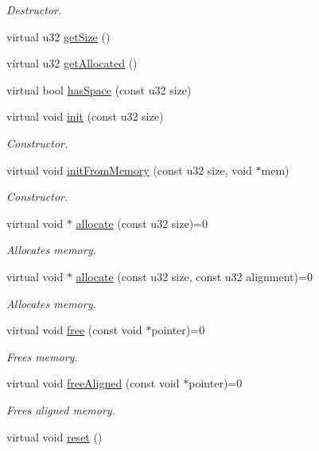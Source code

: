 \begin{DoxyCompactItemize}
\begin{DoxyCompactList}\small\item\em Destructor. \end{DoxyCompactList}\item 
virtual u32 \hyperlink{classDE_1_1Allocator_af8e9d8df95e03bd2a5d2242d67c37ff2}{get\+Size} ()
\item 
virtual u32 \hyperlink{classDE_1_1Allocator_ab1cd017ccd297924b3afec3588f42848}{get\+Allocated} ()
\item 
virtual bool \hyperlink{classDE_1_1Allocator_a021200fc6a7c6fae64e7e98907d334b2}{has\+Space} (const u32 size)
\item 
virtual void \hyperlink{classDE_1_1Allocator_a891c3a1ec3d3713cc742412ac184a6e5}{init} (const u32 size)
\begin{DoxyCompactList}\small\item\em Constructor. \end{DoxyCompactList}\item 
virtual void \hyperlink{classDE_1_1Allocator_acb18b8358ee9565b3ad0c6f1bff1e65e}{init\+From\+Memory} (const u32 size, void $\ast$mem)
\begin{DoxyCompactList}\small\item\em Constructor. \end{DoxyCompactList}\item 
virtual void $\ast$ \hyperlink{classDE_1_1Allocator_a5dfb8172ab7053e4e6e9f21e02bc26f5}{allocate} (const u32 size)=0
\begin{DoxyCompactList}\small\item\em Allocates memory. \end{DoxyCompactList}\item 
virtual void $\ast$ \hyperlink{classDE_1_1Allocator_a87ab42c72ead365ef0f04b9d8ba31b24}{allocate} (const u32 size, const u32 alignment)=0
\begin{DoxyCompactList}\small\item\em Allocates memory. \end{DoxyCompactList}\item 
virtual void \hyperlink{classDE_1_1Allocator_a9a01f5da5adafc6d5cee9b3e3e9859c4}{free} (const void $\ast$pointer)=0
\begin{DoxyCompactList}\small\item\em Frees memory. \end{DoxyCompactList}\item 
virtual void \hyperlink{classDE_1_1Allocator_a765f3ff9d6ff095bdfe4674652542a3d}{free\+Aligned} (const void $\ast$pointer)=0
\begin{DoxyCompactList}\small\item\em Frees aligned memory. \end{DoxyCompactList}\item 
virtual void \hyperlink{classDE_1_1Allocator_a0a08a7747d50ec63e6eaa1740f5de347}{reset} ()\hypertarget{classDE_1_1Allocator_a0a08a7747d50ec63e6eaa1740f5de347}{}\label{classDE_1_1Allocator_a0a08a7747d50ec63e6eaa1740f5de347}


\end{DoxyCompactItemize}
